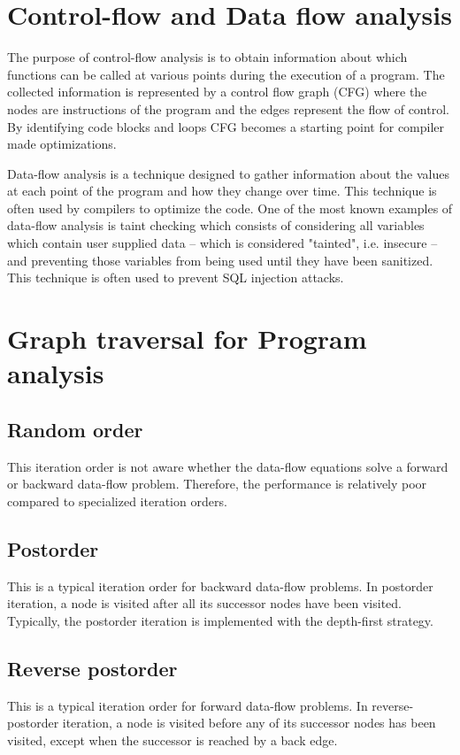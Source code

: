 \section{Control-flow and Data flow analysis}
The purpose of control-flow analysis is to obtain information about which functions can be called at various points during the execution of a program. The collected information is represented by a control flow graph (CFG) where the nodes are instructions of the program and the edges represent the flow of control. By identifying code blocks and loops CFG becomes a starting point for compiler made optimizations.

Data-flow analysis is a technique designed to gather information about the values at each point of the program and how they change over time. This technique is often used by compilers to optimize the code. One of the most known examples of data-flow analysis is taint checking which consists of considering all variables which contain user supplied data – which is considered "tainted", i.e. insecure – and preventing those variables from being used until they have been sanitized. This technique is often used to prevent SQL injection attacks.

\section{Graph traversal for Program analysis}
\subsection{Random order}
This iteration order is not aware whether the data-flow equations solve a forward or backward data-flow problem. Therefore, the performance is relatively poor compared to specialized iteration orders.
\subsection{Postorder}
This is a typical iteration order for backward data-flow problems. In postorder iteration, a node is visited after all its successor nodes have been visited. Typically, the postorder iteration is implemented with the depth-first strategy.
\subsection{Reverse postorder}
This is a typical iteration order for forward data-flow problems. In reverse-postorder iteration, a node is visited before any of its successor nodes has been visited, except when the successor is reached by a back edge. 